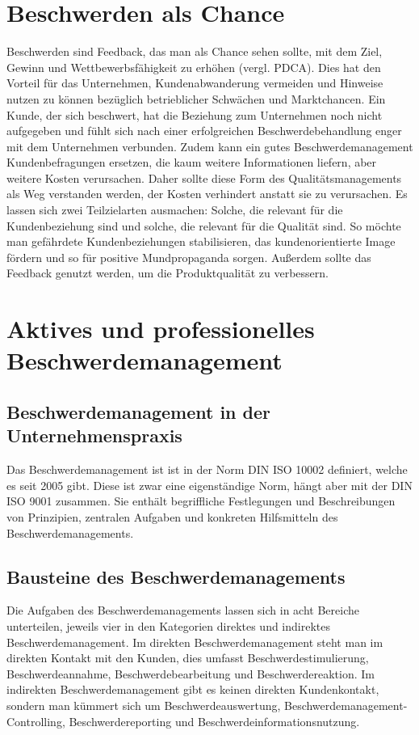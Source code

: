 \documentclass[a4paper,12pt]{article}
\begin{document}
	\section{Beschwerden als Chance}
	Beschwerden sind Feedback, das man als Chance sehen sollte, mit dem Ziel, Gewinn und Wettbewerbsfähigkeit zu erhöhen (vergl. PDCA). Dies hat den Vorteil für das Unternehmen, Kundenabwanderung vermeiden und Hinweise nutzen zu können bezüglich betrieblicher Schwächen und Marktchancen. {\cite{.02.04.2016}} Ein Kunde, der sich beschwert, hat die Beziehung zum Unternehmen noch nicht aufgegeben und fühlt sich nach einer erfolgreichen Beschwerdebehandlung enger mit dem Unternehmen verbunden. Zudem kann ein gutes Beschwerdemanagement Kundenbefragungen ersetzen, die kaum weitere Informationen liefern, aber weitere Kosten verursachen. Daher sollte diese Form des Qualitätsmanagements als Weg verstanden werden, der Kosten verhindert anstatt sie zu verursachen. Es lassen sich zwei Teilzielarten ausmachen: Solche, die relevant für die Kundenbeziehung sind und solche, die relevant für die Qualität sind.
	So möchte man gefährdete Kundenbeziehungen stabilisieren, das kundenorientierte Image fördern und so für positive Mundpropaganda sorgen. Außerdem sollte das Feedback genutzt werden, um die Produktqualität zu verbessern.  {\cite{.02.04.2016}}
	\section{Aktives und professionelles Beschwerdemanagement}
	\subsection{Beschwerdemanagement in der Unternehmenspraxis}
	Das Beschwerdemanagement ist ist in der Norm DIN ISO 10002 definiert, welche es seit 2005 gibt. Diese ist zwar eine eigenständige Norm, hängt aber mit der DIN ISO 9001 zusammen. Sie enthält begriffliche Festlegungen und Beschreibungen von Prinzipien, zentralen Aufgaben und konkreten Hilfsmitteln des Beschwerdemanagements.  {\cite{.02.04.2016}}
	\subsection{Bausteine des Beschwerdemanagements}
	Die Aufgaben des Beschwerdemanagements lassen sich in acht Bereiche unterteilen, jeweils vier in den Kategorien direktes und indirektes Beschwerdemanagement. Im direkten Beschwerdemanagement steht man im direkten Kontakt mit den Kunden, dies umfasst Beschwerdestimulierung, Beschwerdeannahme, Beschwerdebearbeitung und Beschwerdereaktion. Im indirekten Beschwerdemanagement gibt es keinen direkten Kundenkontakt, sondern man kümmert sich um Beschwerdeauswertung, Beschwerdemanagement-Controlling, Beschwerdereporting und Beschwerdeinformationsnutzung.  {\cite{.02.04.2016}}
\end{document}
